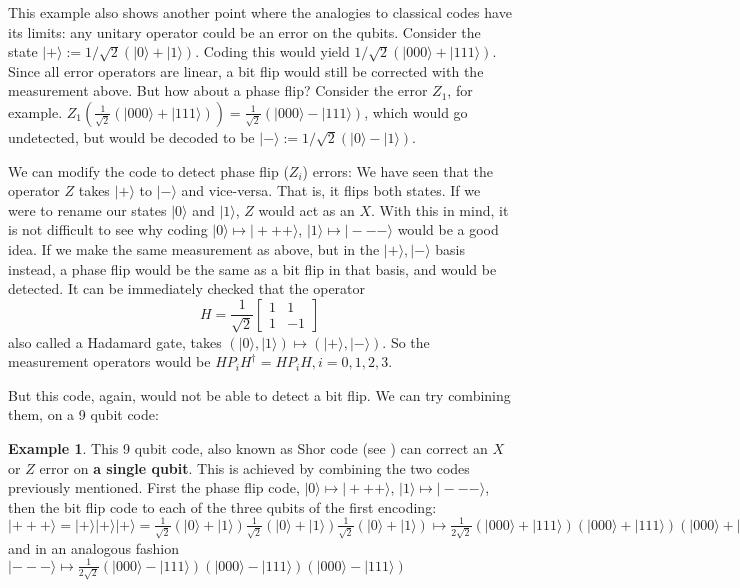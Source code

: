 \documentclass[12pt,a4paper,BCOR15mm,twoside,DIV12]{article}
\theoremstyle{definition}
\newtheorem{ex}[Satz]{Example}
\begin{document}
  This example also shows another point where the analogies to classical codes have its limits: any unitary operator could be an error on the qubits.
  Consider the state $| + \rangle := 1/\sqrt{2}(|0\rangle + |1\rangle)$. Coding this would yield $1/\sqrt{2}(|000\rangle + |111\rangle)$. Since all error operators are linear, a bit flip would still be corrected with the measurement above. But how about a phase flip?
  Consider the error $Z_1$, for example. $Z_1 (\frac{1}{ \sqrt{2}} (|000\rangle + |111\rangle)) = \frac{1}{ \sqrt{2} }(|000\rangle - |111\rangle)$, which would go undetected, but would be decoded to be $|- \rangle := 1/\sqrt{2}(|0\rangle - |1\rangle)$.
  

We can modify the code to detect phase flip ($Z_i$) errors: We have seen that the operator $Z$ takes $ | + \rangle$ to $| - \rangle$ and vice-versa. That is, it flips both states. If we were to rename our states $ | 0 \rangle$ and $|1\rangle$, $Z$ would act as an $X$.
With this in mind, it is not difficult to see why coding $ |0\rangle \mapsto | +++ \rangle$,  $|1 \rangle \mapsto | --- \rangle$ would be a good idea. If we make the same measurement as above, but in the $ | + \rangle, | - \rangle$ basis instead, 
a phase flip would be the same as a bit flip in that basis, and would be detected. It can be immediately checked that the operator \[ H = \frac{1}{\sqrt{2}} \left[ \begin{array}{cc}
 1 & 1 \\
 1 & -1 \end{array} \right] \] also called a Hadamard gate, takes $ (|0\rangle, |1\rangle) \mapsto (|+\rangle , | - \rangle )$. So the measurement operators would be $ H P_i H^\dagger = H P_i H, i = 0,1,2,3$.

But this code, again, would not be able to detect a bit flip. We can try combining them, on a 9 qubit code:

\begin{ex}\label{shorcode}
This 9 qubit code, also known as Shor code (see \cite{NC}) can correct an  $X$ or $Z$ error on \textbf{a single qubit}. This is achieved by combining the two codes previously mentioned.
First the phase flip code, $ |0\rangle \mapsto | +++ \rangle$,  $|1 \rangle \mapsto | --- \rangle$, then the bit flip code to each of the three qubits of the first encoding:
$ |+++\rangle = |+\rangle |+\rangle |+ \rangle = \frac{1}{\sqrt{2}}(|0\rangle + |1\rangle) \frac{1}{\sqrt{2}}(|0\rangle + |1\rangle) \frac{1}{\sqrt{2}}(|0\rangle + |1\rangle) \mapsto \frac{1}{2 \sqrt{2}} (|000\rangle + |111 \rangle) (|000\rangle + |111 \rangle) (|000\rangle + |111 \rangle)$ and 
in an analogous fashion $ |--- \rangle \mapsto  \frac{1}{2 \sqrt{2}} (|000\rangle - |111 \rangle) (|000\rangle - |111 \rangle) (|000\rangle - |111 \rangle)$
\end{ex}
\end{document}
